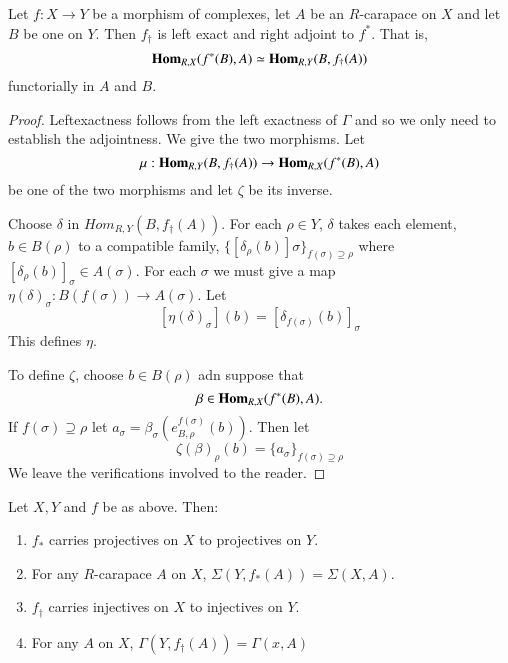 \begin{secprop}\label{chap6-prop-5.4}
Let $f: X\rightarrow Y$ be a morphism of complexes, let $A$ be an $R$-carapace on $X$ and let $B$ be one on $Y$. Then $f_{\dagger}$ is left exact and right adjoint to $f^{*}$. That is,
$$
\operatorname{\mathbf{Hom}}_{R,X}(f^{*}(B), A)\simeq \operatorname{\mathbf{Hom}}_{R,Y}(B, f_{\dagger}(A))
$$
functorially in $A$ and $B$.
\end{secprop}

\begin{proof}
Left\pageoriginale exactness follows from the left exactness of $\Gamma$ and so we only need to establish the adjointness. We give the two morphisms. Let
$$
\mu : \operatorname{\mathbf{Hom}}_{R, Y}(B, f_{\dagger}(A)) \rightarrow \operatorname{\mathbf{Hom}}_{R,X}(f^{*}(B), A)
$$
be one of the two morphisms and let $\zeta$ be its inverse.

Choose $\delta$ in $Hom_{R,Y}(B, f_{\dagger}(A))$. For each $\rho \in Y$, $\delta$ takes each element, $b \in B(\rho)$ to a compatible family, $\{[\delta_{\rho}(b)]\sigma\}_{f(\sigma)\supseteq \rho}$ where $[\delta_{\rho}(b)]_{\sigma} \in A(\sigma)$. For each $\sigma$ we must give a map $\eta (\delta)_{\sigma}: B(f(\sigma)) \rightarrow A(\sigma)$. Let
$$
\left[\eta (\delta)_{\sigma}\right](b) = \left[\delta_{f(\sigma)}(b)\right]_{\sigma}
$$
This defines $\eta$.

To define $\zeta$, choose $b \in B(\rho)$ adn suppose that 
$$
\beta \in \operatorname{\mathbf{Hom}}_{R,X}(f^{*}(B), A).
$$ 
If $f(\sigma)\supseteq \rho$ let $a_{\sigma} = \beta_{\sigma}(e_{B, \rho}^{f(\sigma)}(b))$. Then let
$$
\zeta(\beta)_{\rho}(b) = \{a_{\sigma}\}_{f(\sigma)\supseteq \rho}
$$
We leave the verifications involved to the reader.
\end{proof}

\begin{seccoro}\label{chap6-corollary-5.5}
Let $X, Y$ and $f$ be as above. Then:
    \begin{enumerate}[(1)]
    \item $f_{*}$ carries projectives on $X$ to projectives on $Y$.\label{chap6-corollary5.5-enum-1}
    \item For any $R$-carapace $A$ on $X$, $\Sigma(Y, f_{*}(A)) = \Sigma(X, A)$.\label{chap6-corollary5.5-enum-2}
    \item $f_{\dagger}$ carries injectives on $X$ to injectives on $Y$.\label{chap6-corollary5.5-enum-3}
    \item For any $A$ on $X$, $\Gamma(Y, f_{\dagger}(A))= \Gamma(x, A)$\label{chap6-corollary5.5-enum-4}
    \end{enumerate}
\end{seccoro}

